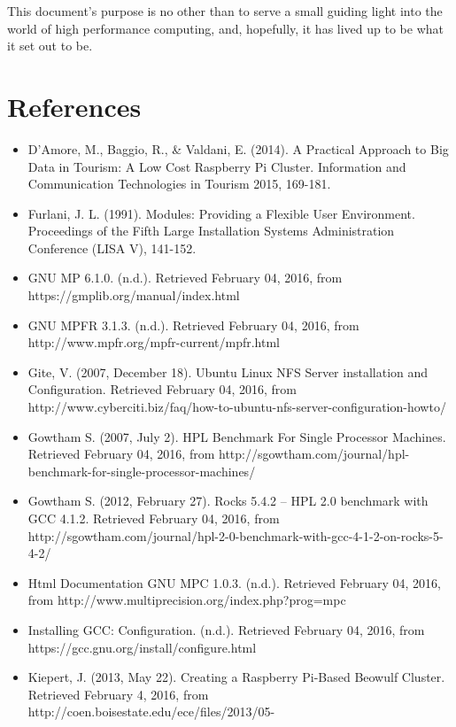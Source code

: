 \documentclass[]{article}
\begin{document}
            This document's purpose is no other than to serve a small guiding light into the world of high performance 
            computing, and, hopefully, it has lived up to be what it set out to be.

            \newpage
            \section{References}
            \begin{itemize}
            \item D'Amore, M., Baggio, R., \& Valdani, E. (2014). A Practical Approach to Big Data in Tourism: A Low Cost Raspberry Pi Cluster. Information and Communication Technologies in Tourism 2015, 169-181.
            \item Furlani, J. L. (1991). Modules: Providing a Flexible User Environment. Proceedings of the Fifth Large Installation Systems Administration Conference (LISA V), 141-152.
            \item GNU MP 6.1.0. (n.d.). Retrieved February 04, 2016, from https://gmplib.org/manual/index.html
            \item GNU MPFR 3.1.3. (n.d.). Retrieved February 04, 2016, from http://www.mpfr.org/mpfr-current/mpfr.html
            \item Gite, V. (2007, December 18). Ubuntu Linux NFS Server installation and Configuration. Retrieved February 04, 2016, from http://www.cyberciti.biz/faq/how-to-ubuntu-nfs-server-configuration-howto/
            \item Gowtham S. (2007, July 2). HPL Benchmark For Single Processor Machines. Retrieved February 04, 2016, from http://sgowtham.com/journal/hpl-benchmark-for-single-processor-machines/
            \item Gowtham S. (2012, February 27). Rocks 5.4.2 – HPL 2.0 benchmark with GCC 4.1.2. Retrieved February 04, 2016, from http://sgowtham.com/journal/hpl-2-0-benchmark-with-gcc-4-1-2-on-rocks-5-4-2/
            \item Html Documentation GNU MPC 1.0.3. (n.d.). Retrieved February 04, 2016, from http://www.multiprecision.org/index.php?prog=mpc
            \item Installing GCC: Configuration. (n.d.). Retrieved February 04, 2016, from https://gcc.gnu.org/install/configure.html
            \item Kiepert, J. (2013, May 22). Creating a Raspberry Pi-Based Beowulf Cluster. Retrieved February 4, 2016, from http://coen.boisestate.edu/ece/files/2013/05-

\end{itemize}
\end{document}
